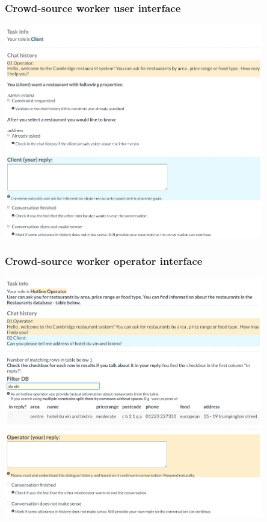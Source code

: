 \documentclass[10pt, compress,british,xcolor={svgnames,dvipsnames,x11names},trans]{beamer}
\begin{document}

\begin{frame}\frametitle{Crowd-source worker user interface}
    \begin{center}
    \includegraphics[width=0.85\textwidth]{./gui-annotators-client.png}
    \end{center}
\end{frame}

\begin{frame}\frametitle{Crowd-source worker operator interface}
    \begin{center}
    \includegraphics[width=0.85\textwidth]{./gui-annotators-system.png}
    \end{center}
\end{frame}
\end{document}
